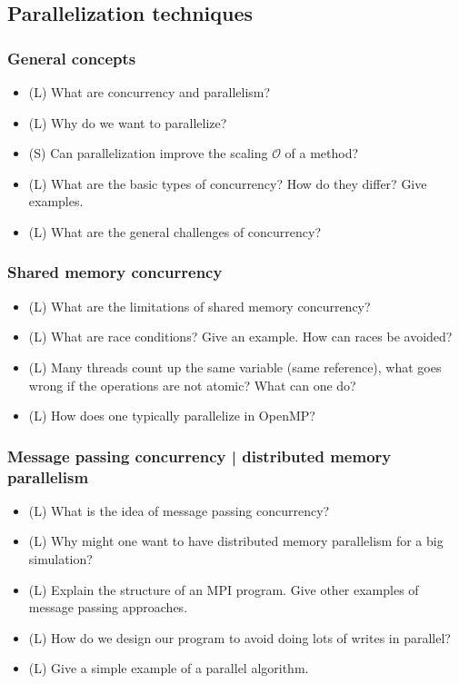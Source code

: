 \subsection*{Parallelization techniques}

\subsubsection*{General concepts}
\begin{itemize}
    \item (L) What are concurrency and parallelism?
    \item (L) Why do we want to parallelize?
    \item (S) Can parallelization improve the scaling $\mathcal{O}$ of a method?
    \item (L) What are the basic types of concurrency? How do they differ? Give examples.
    \item (L) What are the general challenges of concurrency?
\end{itemize}

\subsubsection*{Shared memory concurrency}
\begin{itemize}
    \item (L) What are the limitations of shared memory concurrency?
    \item (L) What are race conditions? Give an example. How can races be avoided?
    \item (L) Many threads count up the same variable (same reference), what goes wrong if the operations are not atomic? What can one do?
    \item (L) How does one typically parallelize in OpenMP?
\end{itemize}

\subsubsection*{Message passing concurrency | distributed memory parallelism}

\begin{itemize}
    \item (L) What is the idea of message passing concurrency?
    \item (L) Why might one want to have distributed memory parallelism for a big simulation?
    \item (L) Explain the structure of an MPI program. Give other examples of message passing approaches.
    \item (L) How do we design our program to avoid doing lots of writes in parallel?
    \item (L) Give a simple example of a parallel algorithm.
\end{itemize}

